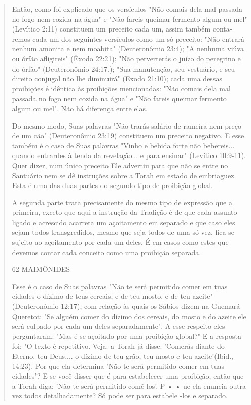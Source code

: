 \begin{quote}
Então, como foi explicado que os versículos "Não comais dela mal passada
no fogo nem cozida na água" e "Não fareis queimar fermento algum ou mel"
(Levítico 2:11) constituem um preceito cada um, assim também conta­remos
cada um dos seguintes versículos como um só preceito: "Não entrará
nenhum amonita e nem moabita" (Deuteronômio 23:4); "A nenhuma viúva ou
órfão afligireis" (Êxodo 22:21); "Não perverterás o juízo do peregrino e
do ór­fão" (Deuteronômio 24:17,); "Sua manutenção, seu vestuário, e seu
direito con­jugal não lhe diminuirá" (Exodo 21:10); cada uma dessas
proibições é idêntica às proibições mencionadas: "Não comais dela mal
passada no fogo nem cozida na água" e "Não fareis queimar fermento algum
ou mel". Não há diferença en­tre elas.

Do mesmo modo, Suas palavras "Não trarás salário de rameira nem preço de
um cão" (Deuteronômio 23:19) constituem um preceito negativo. E esse
também é o caso de Suas palavras "Vinho e bebida forte não bebereis...
quando entrardes à tenda da revelação... e para ensinar" (Levítico
10:9-11). Quer dizer, num único preceito Ele advertiu para que não se
entre no Santuário nem se dê instruções sobre a Torah em estado de
embriaguez. Esta é uma das duas partes do segundo tipo de proibição
global.

A segunda parte trata precisamente do mesmo tipo de expressão que a
primeira, exceto que aqui a instrução da Tradição é de que cada assunto
liga­do e acrescido acarreta um açoitamento em separado e que caso eles
sejam to­dos transgredidos, mesmo que seja todos de uma só vez, fica-se
sujeito ao açoi­tamento por cada um deles. É em casos como estes que
devemos contar cada conceito como uma proibição separada.

62 MAIMÔNIDES

Esse é o caso de Suas palavras "Não te será permitido comer em tuas
cidades o dízimo de teus cereais, e de teu mosto, e de teu azeite"
(Deuteronô­mio 12:17), com relação às quais os Sábios dizem na Guemará
Queretot: "Se al­guém comer do dízimo dos cereais, do mosto e do azeite
ele será culpado por cada um deles separadamente". A esse respeito eles
perguntaram: "Mas é-se açoi­tado por uma proibição global?" E a resposta
foi: "O texto é repetitivo. Veja: a Torah já disse: 'Comerás diante do
Eterno, teu Deus,... o dízimo de teu grão, teu mosto e teu
azeite'(Ibid., 14:23). Por que ela determina 'Não te será permiti­do
comer em tuas cidades'? E se você disser que é para estabelecer uma
proibi­ção, então que a Torah diga: 'Não te será permitido comê-los'. P
• • ue ela enun­cia outra vez todos detalhadamente? Só pode ser para
estabele -los e separado.


\end{quote}
